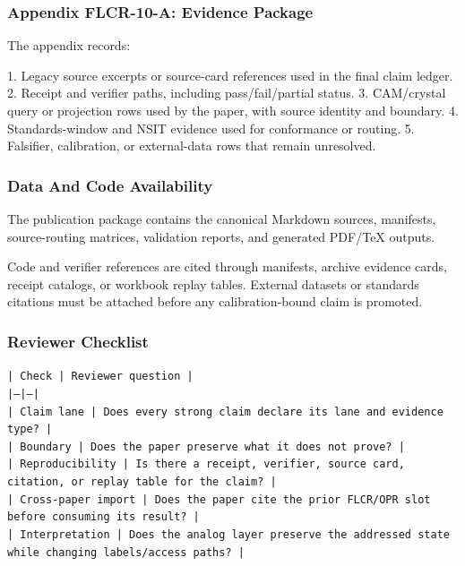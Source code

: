\documentclass[11pt]{article}
\begin{document}
\subsubsection*{Appendix FLCR-10-A: Evidence Package}

The appendix records:

1. Legacy source excerpts or source-card references used in the final claim ledger.
2. Receipt and verifier paths, including pass/fail/partial status.
3. CAM/crystal query or projection rows used by the paper, with source identity and boundary.
4. Standards-window and NSIT evidence used for conformance or routing.
5. Falsifier, calibration, or external-data rows that remain unresolved.

\subsubsection*{Data And Code Availability}

The publication package contains the canonical Markdown sources, manifests, source-routing matrices, validation reports, and generated PDF/TeX outputs.

Code and verifier references are cited through manifests, archive evidence cards, receipt catalogs, or workbook replay tables. External datasets or
standards citations must be attached before any calibration-bound claim is
promoted.

\subsubsection*{Reviewer Checklist}

\noindent\texttt{| Check | Reviewer question |}\\
\noindent\texttt{|---|---|}\\
\noindent\texttt{| Claim lane | Does every strong claim declare its lane and evidence type? |}\\
\noindent\texttt{| Boundary | Does the paper preserve what it does not prove? |}\\
\noindent\texttt{| Reproducibility | Is there a receipt, verifier, source card, citation, or replay table for the claim? |}\\
\noindent\texttt{| Cross-paper import | Does the paper cite the prior FLCR/OPR slot before consuming its result? |}\\
\noindent\texttt{| Interpretation | Does the analog layer preserve the addressed state while changing labels/access paths? |}\\
\end{document}
